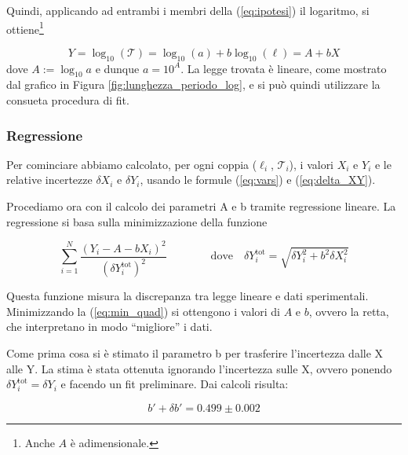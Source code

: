 Quindi, applicando ad entrambi i membri della (\ref{eq:ipotesi}) il logaritmo, si ottiene\footnote{
Anche $A$ è adimensionale.}

\begin{equation}
    Y = \log_{10} (\mathcal{T}) = \log_{10} (a) + b \log_{10} (\ell) = A + b X
\end{equation}
%
dove $A := \log_{10} a$ e dunque $a = 10^A$. La legge trovata è lineare, come mostrato dal grafico
in Figura \ref{fig:lunghezza_periodo_log}, e si può quindi utilizzare la consueta procedura di fit.


\subsubsection{Regressione}
\label{l_regressione}

Per cominciare abbiamo calcolato, per ogni coppia ($\ell_i$, $\mathcal{T}_i$), i valori $X_i$ e $Y_i$
e le relative incertezze $\delta X_i$ e $\delta Y_i$, usando le formule (\ref{eq:vars}) e (\ref{eq:delta_XY}).

Procediamo ora con il calcolo dei parametri A e b tramite regressione lineare. 
La regressione si basa sulla minimizzazione della funzione

\begin{equation}
    \sum_{i=1}^N \frac{(Y_i - A - bX_i)^2}{(\delta Y_i^{\text{tot}})^2}
    \qquad \qquad \text{dove} \quad
    \delta Y_i^{\text{tot}} = \sqrt{\delta Y_i^2 + b^2 \delta X_i^2}
    \label{eq:min_quad}
\end{equation}

Questa funzione misura la discrepanza tra legge lineare e dati sperimentali. Minimizzando la (\ref{eq:min_quad}) si ottengono
i valori di $A$ e $b$, ovvero la retta, che interpretano in modo ``migliore'' i dati.

Come prima cosa si è stimato il parametro b per trasferire l'incertezza dalle X alle Y.
La stima è stata ottenuta ignorando l'incertezza sulle X, ovvero ponendo $\delta Y_i^{\text{tot}} = \delta Y_i$ e facendo un fit preliminare.
Dai calcoli risulta:

\begin{equation}
    b' + \delta b' = 0.499 \pm 0.002
\end{equation}

